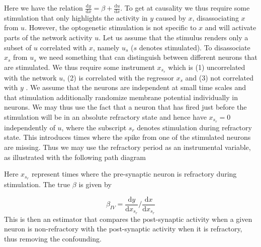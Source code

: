 \documentclass[11pt]{article}
\newcommand{\de}[2]{\frac{\mathrm{d} #1}{\mathrm{d} #2}}
\begin{document}
\begin{center}
\end{center}
Here we have the relation $ \de{y}{x} = \beta + \de{u}{x} $. 
To get at causality we thus require some stimulation that only highlights the activity in $ y $ caused by $ x $, disassociating $x$ from $u$. 
However, the optogenetic stimulation is not specific to $x$ and will activate parts of the network activity $ u $. 
Let us assume that the stimulus renders only a subset of $u$ correlated with $x$, namely $u_s$ ($s$ denotes stimulated). 
To disassociate $x_s$ from $u_s$ we need something that can distinguish between different neurons that are stimulated. 
We thus require some instrument $ x_{s_r} $ which is (1) uncorrelated with the network $ u $, (2) is correlated with the regressor $ x_s $ and (3) not correlated with $ y $ \citep{angrist2008mostly}. 
We assume that the neurons are independent at small time scales and that stimulation additionally randomize membrane potential individually in neurons. 
We may thus use the fact that a neuron that has fired just before the stimulation will be in an absolute refractory state and hence have $ x_{s_r}=0 $ independently of $ u $, where the subscript $ s_r $ denotes stimulation during refractory state. 
This introduces times where the spike from one of the stimulated neurons are missing. 
Thus we may use the refractory period as an instrumental variable, as illustrated with the following path diagram

\begin{center}
\end{center}
Here $ x_{s_r} $ represent times where the pre-synaptic neuron is refractory during stimulation. 
The true $ \beta $ is given \citep{wright1928tariff} by

\begin{equation}
\beta_{IV} = \de{y}{x_{s_r}} / \de{x}{x_{s_r}}
\end{equation}
This is then an estimator that compares the post-synaptic activity when a given neuron is non-refractory with the post-synaptic activity when it is refractory, thus removing the confounding.
\end{document}
